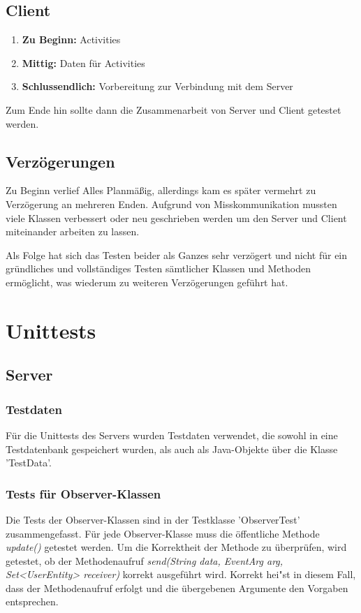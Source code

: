 \documentclass[11pt,a4paper]{scrartcl}
\begin{document}
\subsection{Client}
\begin{enumerate}
	\item \textbf{Zu Beginn:} Activities 

	\item \textbf{Mittig:} Daten für Activities

	\item \textbf{Schlussendlich:} Vorbereitung zur Verbindung mit dem Server
\end{enumerate}

Zum Ende hin sollte dann die Zusammenarbeit von Server und Client getestet werden.

\subsection{Verzögerungen}
Zu Beginn verlief Alles Planmäßig, allerdings kam es später vermehrt zu Verzögerung an mehreren Enden.
Aufgrund von Misskommunikation mussten viele Klassen verbessert oder neu geschrieben werden um den Server und Client miteinander arbeiten zu lassen.
 
Als Folge hat sich das Testen beider als Ganzes sehr verzögert und nicht für ein gründliches und vollständiges Testen sämtlicher Klassen und Methoden ermöglicht, was wiederum zu weiteren Verzögerungen geführt hat.

\newpage

\section{Unittests}

\subsection{Server}

\subsubsection{Testdaten}\label{Testdaten}
Für die Unittests des Servers wurden Testdaten verwendet, die sowohl in eine Testdatenbank gespeichert wurden, als auch als Java-Objekte über die Klasse 'TestData'.

\subsubsection{Tests für Observer-Klassen}
Die Tests der Observer-Klassen sind in der Testklasse 'ObserverTest' zusammengefasst. Für jede Observer-Klasse muss die öffentliche Methode \textit{update()} getestet werden.
Um die Korrektheit der Methode zu überprüfen, wird getestet, ob der Methodenaufruf \textit{send(String data, EventArg arg, Set<UserEntity> receiver)} korrekt ausgeführt wird. Korrekt hei"st in diesem Fall, dass der Methodenaufruf erfolgt und die übergebenen Argumente den Vorgaben entsprechen.
\end{document}
